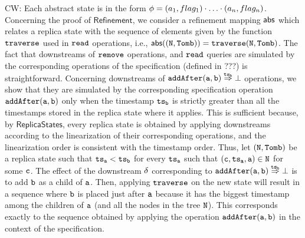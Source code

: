 {\color {red} CW: Each abstract state is in the form $\phi = (a_1,flag_1) \cdot \ldots \cdot (a_n,flag_n)$.} Concerning the proof of $\mathsf{Refinement}$, we consider a refinement mapping $\mathsf{abs}$ which relates a replica state with the sequence of elements given by the function ${\tt traverse}$ used in ${\tt read}$ operations, i.e., $\mathsf{abs}(({\tt N},{\tt Tomb}))={\tt traverse(N, Tomb)}$. The fact that downstreams of ${\tt remove}$ operations, and ${\tt read}$ queries are simulated by the corresponding operations of the specification (defined in ???) is straightforward. Concerning downstreams of $\alabellongind[{\tt addAfter}]{a,b}{\bot}{\ats_b}{}$ operations, we show that they are simulated by the corresponding specification operation $\alabelshort[{\tt addAfter}]{a,b}$ only when the timestamp $\mathtt{ts}_{\tt b}$ is strictly greater than all the timestamps stored in the replica state where it applies. This is sufficient because, by $\mathsf{ReplicaStates}$, every replica state is obtained by applying downstreams according to the linearization of their corresponding operations, and the linearization order is consistent with the timestamp order. Thus, let $({\tt N},{\tt Tomb})$ be a replica state such that $\mathtt{ts}_{\tt a} < \mathtt{ts}_{\tt b}$ for every $\mathtt{ts}_{\tt a}$ such that $({\tt c},\mathtt{ts}_{\tt a},{\tt a})\in {\tt N}$ for some ${\tt c}$. The effect of the downstream $\delta$ corresponding to $\alabellongind[{\tt addAfter}]{a,b}{\bot}{\ats_b}{}$ is to add ${\tt b}$ as a child of ${\tt a}$. Then, applying ${\tt traverse}$ on the new state will result in a sequence where ${\tt b}$ is placed just after ${\tt a}$ because it has the biggest timestamp among the children of ${\tt a}$ (and all the nodes in the tree ${\tt N}$). This corresponds exactly to the sequence obtained by applying the operation $\alabelshort[{\tt addAfter}]{a,b}$ in the context of the specification.

